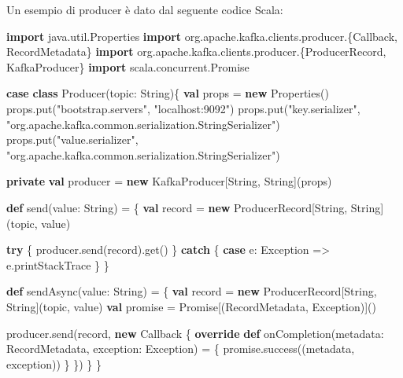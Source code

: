 \documentclass[]{article}
\newenvironment{Shaded}{}{}
\newcommand{\KeywordTok}[1]{\textcolor[rgb]{0.00,0.44,0.13}{\textbf{#1}}}
\newcommand{\StringTok}[1]{\textcolor[rgb]{0.25,0.44,0.63}{#1}}
\newcommand{\FunctionTok}[1]{\textcolor[rgb]{0.02,0.16,0.49}{#1}}
\newcommand{\NormalTok}[1]{#1}
\begin{document}
Un esempio di producer è dato dal seguente codice Scala:

\small  

\begin{Shaded}
\begin{Highlighting}[]
\KeywordTok{import}\NormalTok{ java.}\FunctionTok{util}\NormalTok{.}\FunctionTok{Properties}
\KeywordTok{import}\NormalTok{ org.}\FunctionTok{apache}\NormalTok{.}\FunctionTok{kafka}\NormalTok{.}\FunctionTok{clients}\NormalTok{.}\FunctionTok{producer}\NormalTok{.\{Callback, RecordMetadata\}}
\KeywordTok{import}\NormalTok{ org.}\FunctionTok{apache}\NormalTok{.}\FunctionTok{kafka}\NormalTok{.}\FunctionTok{clients}\NormalTok{.}\FunctionTok{producer}\NormalTok{.\{ProducerRecord, KafkaProducer\}}
\KeywordTok{import}\NormalTok{ scala.}\FunctionTok{concurrent}\NormalTok{.}\FunctionTok{Promise}

\KeywordTok{case} \KeywordTok{class} \FunctionTok{Producer}\NormalTok{(topic: String)\{}
    \KeywordTok{val}\NormalTok{ props = }\KeywordTok{new}\NormalTok{ Properties()}
\NormalTok{    props.}\FunctionTok{put}\NormalTok{(}\StringTok{"bootstrap.servers"}\NormalTok{, }\StringTok{"localhost:9092"}\NormalTok{)}
\NormalTok{    props.}\FunctionTok{put}\NormalTok{(}\StringTok{"key.serializer"}\NormalTok{, }
        \StringTok{"org.apache.kafka.common.serialization.StringSerializer"}\NormalTok{)}
\NormalTok{    props.}\FunctionTok{put}\NormalTok{(}\StringTok{"value.serializer"}\NormalTok{, }
        \StringTok{"org.apache.kafka.common.serialization.StringSerializer"}\NormalTok{)}
    
    \KeywordTok{private} \KeywordTok{val}\NormalTok{ producer = }\KeywordTok{new}\NormalTok{ KafkaProducer[String, String](props)    }
    
    \KeywordTok{def} \FunctionTok{send}\NormalTok{(value: String) = \{}
      \KeywordTok{val}\NormalTok{ record = }\KeywordTok{new}\NormalTok{ ProducerRecord[String, String](topic, value)}

      \KeywordTok{try}\NormalTok{ \{}
\NormalTok{        producer.}\FunctionTok{send}\NormalTok{(record).}\FunctionTok{get}\NormalTok{()}
\NormalTok{      \} }\KeywordTok{catch}\NormalTok{ \{}
        \KeywordTok{case}\NormalTok{ e: Exception => e.}\FunctionTok{printStackTrace}
\NormalTok{      \}}
\NormalTok{    \}   }

    \KeywordTok{def} \FunctionTok{sendAsync}\NormalTok{(value: String) = \{}
        \KeywordTok{val}\NormalTok{ record = }\KeywordTok{new}\NormalTok{ ProducerRecord[String, String](topic, value)}
        \KeywordTok{val}\NormalTok{ promise = Promise[(RecordMetadata, Exception)]()}

\NormalTok{        producer.}\FunctionTok{send}\NormalTok{(record, }\KeywordTok{new}\NormalTok{ Callback \{}
            \KeywordTok{override} \KeywordTok{def} \FunctionTok{onCompletion}\NormalTok{(metadata: RecordMetadata, }
\NormalTok{                                      exception: Exception) = \{}
\NormalTok{                promise.}\FunctionTok{success}\NormalTok{((metadata, exception))}
\NormalTok{            \}}
\NormalTok{        \})}
\NormalTok{    \}}
\NormalTok{\}}
\end{Highlighting}
\end{Shaded}
\end{document}

